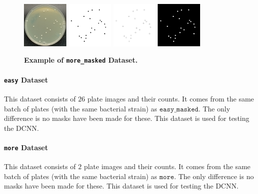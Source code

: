 \documentclass[10pt,letterpaper]{article}
\begin{document}
            \begin{figure}[h]
                \includegraphics[width=0.2\textwidth]{more_0_image}
                \includegraphics[width=0.2\textwidth]{more_0_inside}
                \includegraphics[width=0.2\textwidth]{more_0_edge}
                \includegraphics[width=0.2\textwidth]{more_0_outside}
                \caption{{\bf Example of \texttt{more\_masked} Dataset.}}
                \label{more-masked}
            \end{figure}

        \paragraph*{\texttt{easy} Dataset}
            This dataset consists of $26$ plate images and their counts. It comes from the same batch of plates (with the same bacterial strain) as $\texttt{easy\_masked}$. The only difference is no masks have been made for these. This dataset is used for testing the DCNN.
            
        \paragraph*{\texttt{more} Dataset}
            This dataset consists of $2$ plate images and their counts. It comes from the same batch of plates (with the same bacterial strain) as $\texttt{more}$. The only difference is no masks have been made for these. This dataset is used for testing the DCNN.
\end{document}
